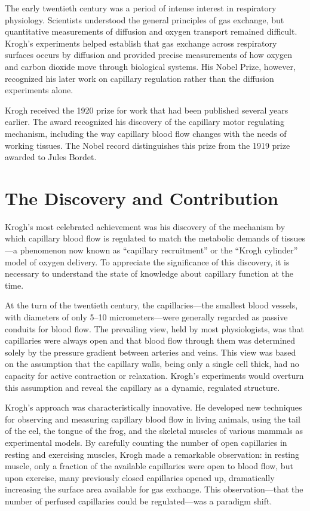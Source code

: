 The early twentieth century was a period of intense interest in respiratory physiology. Scientists understood the general principles of gas exchange, but quantitative measurements of diffusion and oxygen transport remained difficult. Krogh's experiments helped establish that gas exchange across respiratory surfaces occurs by diffusion and provided precise measurements of how oxygen and carbon dioxide move through biological systems. His Nobel Prize, however, recognized his later work on capillary regulation rather than the diffusion experiments alone.\cite{krogh-nobel-article}

Krogh received the 1920 prize for work that had been published several years earlier. The award recognized his discovery of the capillary motor regulating mechanism, including the way capillary blood flow changes with the needs of working tissues. The Nobel record distinguishes this prize from the 1919 prize awarded to Jules Bordet.

\section{The Discovery and Contribution}

Krogh's most celebrated achievement was his discovery of the mechanism by which capillary blood flow is regulated to match the metabolic demands of tissues---a phenomenon now known as ``capillary recruitment'' or the ``Krogh cylinder'' model of oxygen delivery. To appreciate the significance of this discovery, it is necessary to understand the state of knowledge about capillary function at the time.

At the turn of the twentieth century, the capillaries---the smallest blood vessels, with diameters of only 5--10 micrometers---were generally regarded as passive conduits for blood flow. The prevailing view, held by most physiologists, was that capillaries were always open and that blood flow through them was determined solely by the pressure gradient between arteries and veins. This view was based on the assumption that the capillary walls, being only a single cell thick, had no capacity for active contraction or relaxation. Krogh's experiments would overturn this assumption and reveal the capillary as a dynamic, regulated structure.

Krogh's approach was characteristically innovative. He developed new techniques for observing and measuring capillary blood flow in living animals, using the tail of the eel, the tongue of the frog, and the skeletal muscles of various mammals as experimental models. By carefully counting the number of open capillaries in resting and exercising muscles, Krogh made a remarkable observation: in resting muscle, only a fraction of the available capillaries were open to blood flow, but upon exercise, many previously closed capillaries opened up, dramatically increasing the surface area available for gas exchange. This observation---that the number of perfused capillaries could be regulated---was a paradigm shift.


